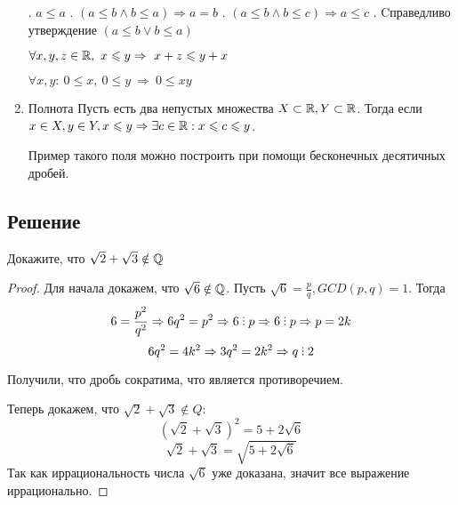 \begin{enumerate}
	. $a \leqslant a$
	. $(a \leqslant b \land b \leqslant a) \Rightarrow a = b$
	. $(a \leqslant b \land b \leqslant c) \Rightarrow a \leqslant c$
	. Cправедливо утверждение $(a \leqslant b \lor b \leqslant a)$
	
	\subitem $\forall x, y, z \in \mathbb{R}, \ x \leqslant y \Rightarrow \ x + z \leqslant y + x$
	
	\subitem $\forall x, y: \ 0 \leqslant x, \ 0 \leqslant y \  \Rightarrow  \ 0 \leqslant xy$
			
	\item Полнота
	Пусть есть два непустых множества $X \subset \mathbb{R}, Y \subset \mathbb{R}$. Тогда если $ x \in X, y \in Y, x \leqslant y \Rightarrow \exists c \in \mathbb{R}: x \leqslant c \leqslant y$.
	
	
	Пример такого поля можно построить при помощи бесконечных десятичных дробей.
\end{enumerate}


\subsection*{Решение}
\begin{task}
	Докажите, что $\sqrt{2} + \sqrt{3} \notin \mathbb{Q}$
\end{task}

\begin{proof}
Для начала докажем, что $\sqrt{6} \notin \mathbb{Q}$. Пусть $\sqrt{6} = \frac{p}{q}, GCD(p, q) = 1$. Тогда
\[
6 = \frac{p^2}{q^2} \Rightarrow 6q^2 = p^2 \Rightarrow 6 \divby p \Rightarrow 6 \divby p \Rightarrow p = 2k
\]
\[
6q^2 = 4k^2 \Rightarrow 3q^2 = 2k^2 \Rightarrow q \divby 2
\]

Получили, что дробь сократима, что является противоречием.

Теперь докажем, что $\sqrt{2} + \sqrt{3} \notin Q$:
\[
(\sqrt{2} + \sqrt{3})^2 = 5 + 2\sqrt{6}
\]
\[
\sqrt{2} + \sqrt{3} = \sqrt{5 + 2\sqrt{6}}
\]
Так как иррациональность числа $ \sqrt{6} $ уже доказана, значит все выражение иррационально.
\end{proof}

